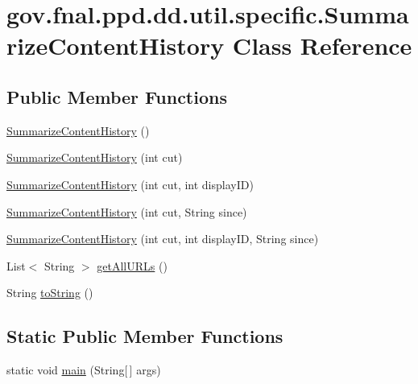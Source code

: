 \hypertarget{classgov_1_1fnal_1_1ppd_1_1dd_1_1util_1_1specific_1_1SummarizeContentHistory}{\section{gov.\-fnal.\-ppd.\-dd.\-util.\-specific.\-Summarize\-Content\-History Class Reference}
\label{classgov_1_1fnal_1_1ppd_1_1dd_1_1util_1_1specific_1_1SummarizeContentHistory}
}
\subsection*{Public Member Functions}
\begin{DoxyCompactItemize}
\item 
\hyperlink{classgov_1_1fnal_1_1ppd_1_1dd_1_1util_1_1specific_1_1SummarizeContentHistory_a07b36df3b48937aa6285b79630c7b92c}{Summarize\-Content\-History} ()
\item 
\hyperlink{classgov_1_1fnal_1_1ppd_1_1dd_1_1util_1_1specific_1_1SummarizeContentHistory_a545f156232456ac6d7706d3e2d8a5671}{Summarize\-Content\-History} (int cut)
\item 
\hyperlink{classgov_1_1fnal_1_1ppd_1_1dd_1_1util_1_1specific_1_1SummarizeContentHistory_a96a637407dacad1fcaf991df32c68d05}{Summarize\-Content\-History} (int cut, int display\-I\-D)
\item 
\hyperlink{classgov_1_1fnal_1_1ppd_1_1dd_1_1util_1_1specific_1_1SummarizeContentHistory_a567b7c290c2919a56c023644defafe34}{Summarize\-Content\-History} (int cut, String since)
\item 
\hyperlink{classgov_1_1fnal_1_1ppd_1_1dd_1_1util_1_1specific_1_1SummarizeContentHistory_aecebd07f7308c2b9651b730e81a6c91f}{Summarize\-Content\-History} (int cut, int display\-I\-D, String since)
\item 
List$<$ String $>$ \hyperlink{classgov_1_1fnal_1_1ppd_1_1dd_1_1util_1_1specific_1_1SummarizeContentHistory_a9c72f09ca5c395ea06aa3b3b447e6b81}{get\-All\-U\-R\-Ls} ()
\item 
String \hyperlink{classgov_1_1fnal_1_1ppd_1_1dd_1_1util_1_1specific_1_1SummarizeContentHistory_a823a11ae396d447a2e3b22b108fdd395}{to\-String} ()
\end{DoxyCompactItemize}
\subsection*{Static Public Member Functions}
\begin{DoxyCompactItemize}
\item 
static void \hyperlink{classgov_1_1fnal_1_1ppd_1_1dd_1_1util_1_1specific_1_1SummarizeContentHistory_a6f1c3bb2c85e1ae8a47f2c97600884dd}{main} (String\mbox{[}$\,$\mbox{]} args)
\end{DoxyCompactItemize}


